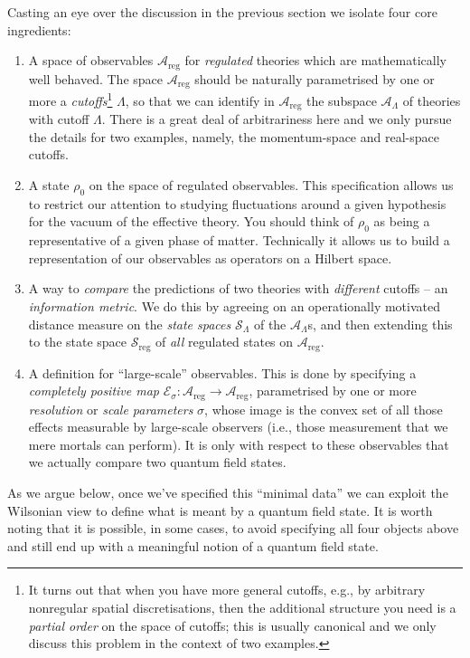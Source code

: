\documentclass[11pt]{amsart}
\theoremstyle{plain}%
\theoremstyle{definition}
\theoremstyle{remark}
\begin{document}
Casting an eye over the discussion in the previous section we isolate four core ingredients:
\begin{enumerate}
	\item A space of observables $\mathcal{A}_{\text{reg}}$ for \emph{regulated} theories which are mathematically well behaved. The space $\mathcal{A}_{\text{reg}}$ should be naturally parametrised by one or more a \emph{cutoffs}\footnote{It turns out that when you have more general cutoffs, e.g., by arbitrary nonregular spatial discretisations, then the additional structure you need is a \emph{partial order} on the space of cutoffs; this is usually canonical and we only discuss this problem in the context of two examples.} $\Lambda$, so that we can identify in $\mathcal{A}_{\text{reg}}$ the subspace $\mathcal{A}_{\Lambda}$ of theories with cutoff $\Lambda$. There is a great deal of arbitrariness here and we only pursue the details for two examples, namely, the momentum-space and real-space cutoffs.
	\item A state $\rho_0$ on the space of regulated observables. This specification allows us to restrict our attention to studying fluctuations around a given hypothesis for the vacuum of the effective theory. You should think of $\rho_0$ as being a representative of a given phase of matter. Technically it allows us to build a representation of our observables as operators on a Hilbert space.  
	\item A way to \emph{compare} the predictions of two theories with \emph{different} cutoffs -- an \emph{information metric}. We do this by agreeing on an operationally motivated distance measure on the \emph{state spaces} $\mathcal{S}_\Lambda$ of the $\mathcal{A}_\Lambda$s, and then extending this to the state space $\mathcal{S}_{\text{reg}}$ of \emph{all} regulated states on $\mathcal{A}_{\text{reg}}$.
	\item A definition for ``large-scale'' observables. This is done by specifying a \emph{completely positive map} $\mathcal{E}_\sigma : \mathcal{A}_{\text{reg}} \rightarrow \mathcal{A}_{\text{reg}}$, parametrised by one or more \emph{resolution} or \emph{scale parameters} $\sigma$, whose image is the convex set of all those effects measurable by large-scale observers (i.e., those measurement that we mere mortals can perform). It is only with respect to these observables that we actually compare two quantum field states.
\end{enumerate}  
As we argue below, once we've specified this ``minimal data'' we can exploit the Wilsonian view to define what is meant by a quantum field state. It is worth noting that it is possible, in some cases, to avoid specifying all four objects above and still end up with a meaningful notion of a quantum field state.
\end{document}
